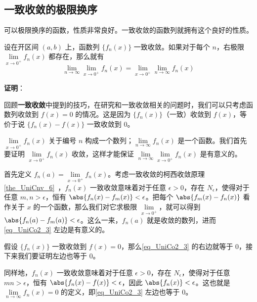 \subsection{一致收敛的极限换序}

可以极限换序的函数，性质非常良好。一致收敛的函数列就拥有这个良好的性质。

\begin{theorem}{}\label{the_UniCo2_1}
设在开区间 $(a, b)$ 上，函数列 $\{f_n(x)\}$ 一致收敛。如果对于每个 $n$，右极限 $\lim\limits_{x\to 0^+}f_n(x)$ 都存在，那么就有
\begin{equation}\label{eq_UniCo2_3}
\lim\limits_{n\to\infty}\lim\limits_{x\to 0^+}f_n(x)=\lim\limits_{x\to 0^+}\lim\limits_{n\to\infty}f_n(x)
\end{equation}
\end{theorem}

\textbf{证明}：

回顾\textbf{一致收敛}中提到的技巧，在研究和一致收敛相关的问题时，我们可以只考虑函数列收敛到 $f(x)=0$ 的情况。这是因为 $\{f_n(x)\}$（一致）收敛到 $f(x)$，等价于说 $\{f_n(x)-f(x)\}$ 一致收敛到 $0$。

$\lim\limits_{x\to 0^+}f_n(x)$ 关于编号 $n$ 构成一个数列；$\lim\limits_{n\to\infty}f_n(x)$ 是一个函数。我们首先要证明 $\lim\limits_{x\to 0^+}f_n(x)$ 收敛，这样才能保证 $\lim\limits_{n\to\infty}\lim\limits_{x\to 0^+}f_n(x)$ 是有意义的。

首先定义 $f_n(a)=\lim\limits_{x\to 0^+}f_n(x)$。考虑一致收敛的柯西收敛原理\autoref{the_UniCnv_6}~，$f_n(x)$ 一致收敛意味着对于任意 $\epsilon>0$，存在 $N_\epsilon$，使得对于任意 $m, n>\epsilon$，恒有 $\abs{f_n(x)-f_m(x)}<\epsilon$。把每个 $\abs{f_m(x)-f_n(x)}$ 看作关于 $x$ 的一个函数，那么我们对它求极限 $\lim\limits_{x\to 0^+}$，就可以得到 $\abs{f_n(a)-f_m(a)}<\epsilon$。这么一来，$f_n(a)$ 就是收敛的数列，进而\autoref{eq_UniCo2_3} 左边是有意义的。

假设 $\{f_n(x)\}$ 一致收敛到 $f(x)=0$，那么\autoref{eq_UniCo2_3} 的右边就等于 $0$，接下来我们要证明左边也等于 $0$。

同样地，$f_n(x)$ 一致收敛意味着对于任意 $\epsilon>0$，存在 $N_\epsilon$，使得对于任意 $mn>\epsilon$，恒有 $\abs{f_n(x)-f(x)}<\epsilon$，因此 $\abs{f_n(x)}<\epsilon$。这也就是 $\lim\limits_{n\to\infty}f_n(x)=0$ 的定义，即\autoref{eq_UniCo2_3} 左边也等于 $0$。


